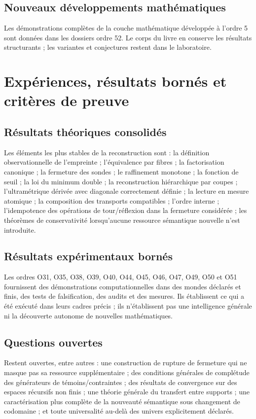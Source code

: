 \documentclass[11pt,a4paper,openany]{book}
\begin{document}
\section{Nouveaux développements mathématiques}
Les démonstrations complètes de la couche mathématique développée à l'ordre 5 sont données dans les dossiers ordre 52. Le corps du livre en conserve les résultats structurants ; les variantes et conjectures restent dans le laboratoire.

\chapter{Expériences, résultats bornés et critères de preuve}
\section{Résultats théoriques consolidés}
Les éléments les plus stables de la reconstruction sont : la définition observationnelle de l'empreinte ; l'équivalence par fibres ; la factorisation canonique ; la fermeture des sondes ; le raffinement monotone ; la fonction de seuil ; la loi du minimum double ; la reconstruction hiérarchique par coupes ; l'ultramétrique dérivée avec diagonale correctement définie ; la lecture en mesure atomique ; la composition des transports compatibles ; l'ordre interne ; l'idempotence des opérations de tour/réflexion dans la fermeture considérée ; les théorèmes de conservativité lorsqu'aucune ressource sémantique nouvelle n'est introduite.

\section{Résultats expérimentaux bornés}
Les ordres O31, O35, O38, O39, O40, O44, O45, O46, O47, O49, O50 et O51 fournissent des démonstrations computationnelles dans des mondes déclarés et finis, des tests de falsification, des audits et des mesures. Ils établissent ce qui a été exécuté dans leurs cadres précis ; ils n'établissent pas une intelligence générale ni la découverte autonome de nouvelles mathématiques.

\section{Questions ouvertes}
Restent ouvertes, entre autres : une construction de rupture de fermeture qui ne masque pas sa ressource supplémentaire ; des conditions générales de complétude des générateurs de témoins/contraintes ; des résultats de convergence sur des espaces récursifs non finis ; une théorie générale du transfert entre supports ; une caractérisation plus complète de la nouveauté sémantique sous changement de codomaine ; et toute universalité au-delà des univers explicitement déclarés.
\end{document}
